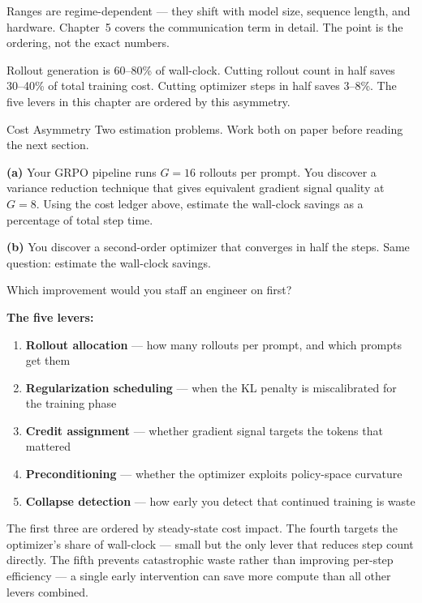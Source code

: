 Ranges are regime-dependent --- they shift with model size, sequence length, and hardware. Chapter~5 covers the communication term in detail. The point is the ordering, not the exact numbers.

Rollout generation is 60--80\% of wall-clock. Cutting rollout count in half saves 30--40\% of total training cost. Cutting optimizer steps in half saves 3--8\%. The five levers in this chapter are ordered by this asymmetry.

\begin{thinkfirst}{Cost Asymmetry}
Two estimation problems. Work both on paper before reading the next section.

\textbf{(a)} Your GRPO pipeline runs $G = 16$ rollouts per prompt. You discover a variance reduction technique that gives equivalent gradient signal quality at $G = 8$. Using the cost ledger above, estimate the wall-clock savings as a percentage of total step time.

\textbf{(b)} You discover a second-order optimizer that converges in half the steps. Same question: estimate the wall-clock savings.

Which improvement would you staff an engineer on first?
\end{thinkfirst}

\medskip
\textbf{The five levers:}
\begin{enumerate}
  \item \textbf{Rollout allocation} --- how many rollouts per prompt, and which prompts get them
  \item \textbf{Regularization scheduling} --- when the KL penalty is miscalibrated for the training phase
  \item \textbf{Credit assignment} --- whether gradient signal targets the tokens that mattered
  \item \textbf{Preconditioning} --- whether the optimizer exploits policy-space curvature
  \item \textbf{Collapse detection} --- how early you detect that continued training is waste
\end{enumerate}

The first three are ordered by steady-state cost impact. The fourth targets the optimizer's share of wall-clock --- small but the only lever that reduces step count directly. The fifth prevents catastrophic waste rather than improving per-step efficiency --- a single early intervention can save more compute than all other levers combined.

